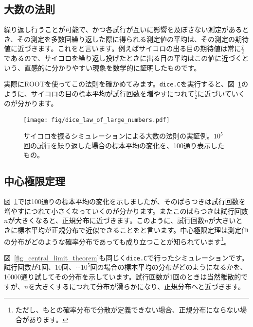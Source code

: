 \subsection{大数の法則}

繰り返し行うことが可能で、かつ各試行が互いに影響を及ぼさない測定があるとき、その測定を多数回繰り返した際に得られる測定値の平均は、その測定の期待値に近づきます。これをと言います。例えばサイコロの出る目の期待値は常に$\frac{7}{2}$であるので、サイコロを繰り返し投げたときに出る目の平均はこの値に近づくという、直感的に分かりやすい現象を数学的に証明したものです。

実際にROOTを使ってこの法則を確かめてみます。\texttt{dice.C}を実行すると、図~\ref{fig_dice_law_of_large_numbers}のように、サイコロの目の標本平均が試行回数を増やすにつれて$\frac{7}{2}$に近づいていくのが分かります。

\begin{figure}
  \centering
  \texttt{[image: fig/dice\_law\_of\_large\_numbers.pdf]}
  \caption{サイコロを振るシミュレーションによる大数の法則の実証例。$10^5$回の試行を繰り返した場合の標本平均の変化を、100通り表示したもの。}
  \label{fig_dice_law_of_large_numbers}
\end{figure}

\subsection{中心極限定理}

図~\ref{fig_dice_law_of_large_numbers}では100通りの標本平均の変化を示しましたが、そのばらつきは試行回数を増やすにつれて小さくなっていくのが分かります。またこのばらつきは試行回数$n$が大きくなると、正規分布に近づきます。このように、試行回数$n$が大きいときに標本平均が正規分布で近似できることをと言います。中心極限定理は測定値の分布がどのような確率分布であっても成り立つことが知られています\footnote{ただし、もとの確率分布で分散が定義できない場合、正規分布にならない場合があります。}。

図~\ref{fig_central_limit_theorem}も同じく\texttt{dice.C}で行ったシミュレーションです。試行回数が1回、10回、$\cdots$$10^5$回の場合の標本平均の分布がどのようになるかを、10000通り試してその分布を示しています。試行回数が1回のときは当然離散的ですが、$n$を大きくするにつれて分布が滑らかになり、正規分布へと近づきます。

